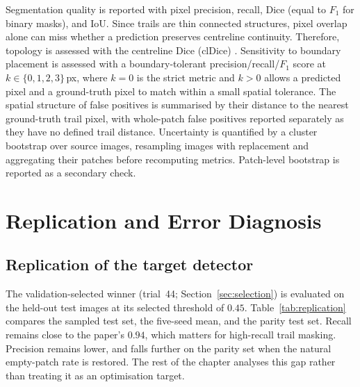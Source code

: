\documentclass{cam-thesis}
\begin{document}
Segmentation quality is reported with pixel precision, recall, Dice (equal to
$F_1$ for binary masks), and IoU. Since trails are thin connected structures,
pixel overlap alone can miss whether a prediction preserves centreline continuity.
Therefore, topology is assessed with the centreline Dice
(clDice) \citep{shit2021}. Sensitivity to boundary placement is assessed with a
boundary-tolerant precision/recall/$F_1$ score at
$k\in\{0,1,2,3\}$\,px, where $k=0$ is the strict metric and $k>0$ allows a
predicted pixel and a ground-truth pixel to match within a small spatial
tolerance. The spatial structure of false positives is summarised by their
distance to the nearest ground-truth trail pixel, with whole-patch false
positives reported separately as they have no defined trail distance.
Uncertainty is quantified by a cluster bootstrap over source images,
resampling images with replacement and aggregating their patches before
recomputing metrics. Patch-level bootstrap is reported as a secondary check.

\chapter{Replication and Error Diagnosis}
\label{ch:analysis}

\section{Replication of the target detector}
\label{sec:replication}

The validation-selected winner (trial~44; Section~\ref{sec:selection}) is
evaluated on the held-out test images at its selected threshold of $0.45$.
Table~\ref{tab:replication} compares the sampled test set, the five-seed mean,
and the parity test set. Recall remains close to the paper's $0.94$, which
matters for high-recall trail masking. Precision remains lower, and falls further
on the parity set when the natural empty-patch rate is restored. The rest of the
chapter analyses this gap rather than treating it as an optimisation target.
\end{document}
